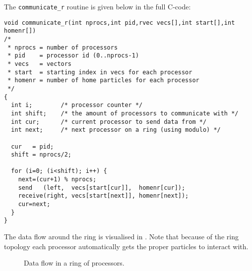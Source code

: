 The {\tt communicate\_r} routine is given below in the full C-code:
\begin{footnotesize}
\begin{verbatim}
void communicate_r(int nprocs,int pid,rvec vecs[],int start[],int homenr[])
/* 
 * nprocs = number of processors
 * pid    = processor id (0..nprocs-1)
 * vecs   = vectors
 * start  = starting index in vecs for each processor
 * homenr = number of home particles for each processor
 */
{
  int i;        /* processor counter */
  int shift;    /* the amount of processors to communicate with */
  int cur;      /* current processor to send data from */
  int next;     /* next processor on a ring (using modulo) */

  cur   = pid;
  shift = nprocs/2;

  for (i=0; (i<shift); i++) {
    next=(cur+1) % nprocs;      
    send   (left,  vecs[start[cur]],  homenr[cur]);
    receive(right, vecs[start[next]], homenr[next]);
    cur=next;
  }
}
\end{verbatim}

\end{footnotesize}

The data flow around the ring is visualised in . 
Note that because of the ring topology each processor automatically 
gets the proper particles to interact with.
\begin {figure}
\centerline{}
\caption {Data flow in a ring of processors.}
\label{fig:ring}
\end {figure}


